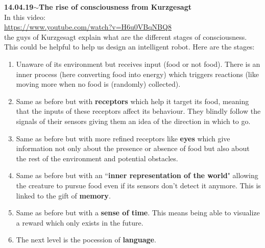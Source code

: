 \documentclass[11pt,a4paper]{article}
\newenvironment{loggentry}[2]%
{\noindent\textbf{#1}\hspace{1cm}$\mathbf{\sim}$\text{ }\textbf{#2}\\}{\vspace{0.5cm}}
\begin{document}
\begin{loggentry}{14.04.19}{The rise of consciousness from Kurzgesagt}

In this video:\\
\url{https://www.youtube.com/watch?v=H6u0VBqNBQ8}\\
the guys of Kurzgesagt explain what are the different stages of consciousness. This could be helpful to help us design an intelligent robot. Here are the stages:\\
\begin{enumerate}
\item Unaware of its environment but receives input (food or not food). There is an inner process (here converting food into energy) which triggers reactions (like moving more when no food is (randomly) collected).
\item Same as before but with \textbf{receptors} which help it target its food, meaning that the inputs of these receptors affect its behaviour. They blindly follow the signals of their sensors giving them an idea of the direction in which to go.
\item Same as before but with more refined receptors like \textbf{eyes} which give information not only about the presence or absence of food but also about the rest of the environment and potential obstacles.
\item Same as before but with an ``\textbf{inner representation of the world}" allowing the creature to pursue food even if its sensors don't detect it anymore. This is linked to the gift of \textbf{memory}.
\item Same as before but with a \textbf{sense of time}. This means being able to visualize a reward which only exists in the future.
\item The next level is the pocession of \textbf{language}.
\end{enumerate}

\end{loggentry}
\end{document}

